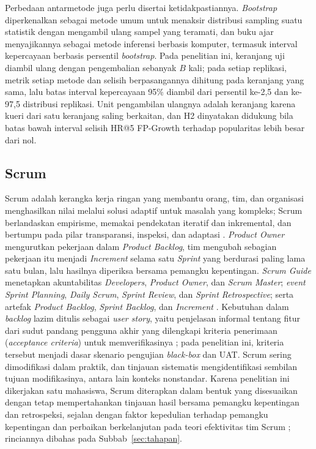Perbedaan antarmetode juga perlu disertai ketidakpastiannya. \textit{Bootstrap} diperkenalkan \citet*{efron1979bootstrap} sebagai metode umum untuk menaksir distribusi sampling suatu statistik dengan mengambil ulang sampel yang teramati, dan buku ajar \citet*{efron1994introduction} menyajikannya sebagai metode inferensi berbasis komputer, termasuk interval kepercayaan berbasis persentil \textit{bootstrap}. Pada penelitian ini, keranjang uji diambil ulang dengan pengembalian sebanyak $B$ kali; pada setiap replikasi, metrik setiap metode dan selisih berpasangannya dihitung pada keranjang yang sama, lalu batas interval kepercayaan 95\% diambil dari persentil ke-2,5 dan ke-97,5 distribusi replikasi. Unit pengambilan ulangnya adalah keranjang karena kueri dari satu keranjang saling berkaitan, dan H2 dinyatakan didukung bila batas bawah interval selisih HR@5 FP-Growth terhadap popularitas lebih besar dari nol.

\subsection{Scrum}
\label{subsec:scrum}

Scrum adalah kerangka kerja ringan yang membantu orang, tim, dan organisasi menghasilkan nilai melalui solusi adaptif untuk masalah yang kompleks; Scrum berlandaskan empirisme, memakai pendekatan iteratif dan inkremental, dan bertumpu pada pilar transparansi, inspeksi, dan adaptasi \citep*{schwaber2020scrum}. \textit{Product Owner} mengurutkan pekerjaan dalam \textit{Product Backlog}, tim mengubah sebagian pekerjaan itu menjadi \textit{Increment} selama satu \textit{Sprint} yang berdurasi paling lama satu bulan, lalu hasilnya diperiksa bersama pemangku kepentingan. \textit{Scrum Guide} menetapkan akuntabilitas \textit{Developers}, \textit{Product Owner}, dan \textit{Scrum Master}; \textit{event} \textit{Sprint Planning}, \textit{Daily Scrum}, \textit{Sprint Review}, dan \textit{Sprint Retrospective}; serta artefak \textit{Product Backlog}, \textit{Sprint Backlog}, dan \textit{Increment} \citep*{schwaber2020scrum}. Kebutuhan dalam \textit{backlog} lazim ditulis sebagai \textit{user story}, yaitu penjelasan informal tentang fitur dari sudut pandang pengguna akhir yang dilengkapi kriteria penerimaan (\textit{acceptance criteria}) untuk memverifikasinya \citep*{ferreira2022towards}; pada penelitian ini, kriteria tersebut menjadi dasar skenario pengujian \textit{black-box} dan UAT. Scrum sering dimodifikasi dalam praktik, dan tinjauan sistematis \citet*{hron2022why} mengidentifikasi sembilan tujuan modifikasinya, antara lain konteks nonstandar. Karena penelitian ini dikerjakan satu mahasiswa, Scrum diterapkan dalam bentuk yang disesuaikan dengan tetap mempertahankan tinjauan hasil bersama pemangku kepentingan dan retrospeksi, sejalan dengan faktor kepedulian terhadap pemangku kepentingan dan perbaikan berkelanjutan pada teori efektivitas tim Scrum \citep*{verwijs2023theory}; rinciannya dibahas pada Subbab~\ref{sec:tahapan}.

